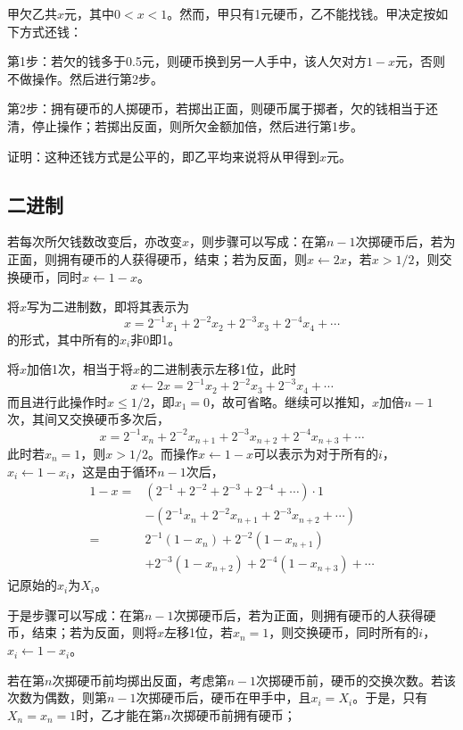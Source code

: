 

甲欠乙共$x$元，其中$0 < x < 1$。然而，甲只有1元硬币，乙不能找钱。甲决定按如下方式还钱：

第1步：若欠的钱多于0.5元，则硬币换到另一人手中，该人欠对方$1 - x$元，否则不做操作。然后进行第2步。

第2步：拥有硬币的人掷硬币，若掷出正面，则硬币属于掷者，欠的钱相当于还清，停止操作；若掷出反面，则所欠金额加倍，然后进行第1步。

证明：这种还钱方式是公平的，即乙平均来说将从甲得到$x$元。

\subsection{二进制}

若每次所欠钱数改变后，亦改变$x$，则步骤可以写成：在第$n - 1$次掷硬币后，若为正面，则拥有硬币的人获得硬币，结束；若为反面，则$x \leftarrow 2x$，若$x > 1/2$，则交换硬币，同时$x \leftarrow 1 - x$。

将$x$写为二进制数，即将其表示为
\[ x = 2^{-1}x_1 + 2^{-2}x_2 + 2^{-3}x_3 + 2^{-4}x_4 + \cdots \]
的形式，其中所有的$x_i$非0即1。

将$x$加倍1次，相当于将$x$的二进制表示左移1位，此时
\[ x \leftarrow 2x = 2^{-1}x_2 + 2^{-2}x_3 + 2^{-3}x_4 + \cdots \]
而且进行此操作时$x \le 1/2$，即$x_1 = 0$，故可省略。继续可以推知，$x$加倍$n - 1$次，其间又交换硬币多次后，
\[ x = 2^{-1}x_n + 2^{-2}x_{n + 1} + 2^{-3}x_{n + 2} + 2^{-4}x_{n + 3} + \cdots \]
此时若$x_n = 1$，则$x > 1/2$。而操作$x \leftarrow 1 - x$可以表示为对于所有的$i$，$x_i \leftarrow 1 - x_i$，这是由于循环$n - 1$次后，
\begin{align*}
  1 - x ={}& \left(2^{-1} + 2^{-2} + 2^{-3} + 2^{-4} + \cdots\right)\cdot1 \\
  &- \left(2^{-1}x_n + 2^{-2}x_{n + 1} + 2^{-3}x_{n + 2} + \cdots\right) \\
  ={}& 2^{-1}(1 - x_n) + 2^{-2}(1 - x_{n + 1}) \\
  &+ 2^{-3}(1 - x_{n + 2})+ 2^{-4}(1 - x_{n + 3}) + \cdots
\end{align*}
记原始的$x_i$为$X_i$。

于是步骤可以写成：在第$n - 1$次掷硬币后，若为正面，则拥有硬币的人获得硬币，结束；若为反面，则将$x$左移1位，若$x_n = 1$，则交换硬币，同时所有的$i$，$x_i \leftarrow 1 - x_i$。

若在第$n$次掷硬币前均掷出反面，考虑第$n - 1$次掷硬币前，硬币的交换次数。若该次数为偶数，则第$n - 1$次掷硬币后，硬币在甲手中，且$x_i = X_i$。于是，只有$X_n = x_n = 1$时，乙才能在第$n$次掷硬币前拥有硬币；


